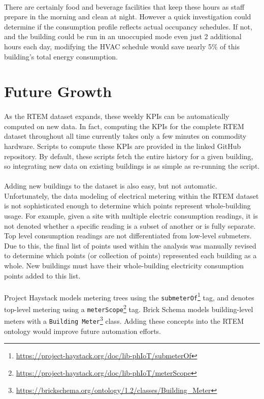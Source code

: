 \documentclass[a4paper]{article}
\begin{document}
\paragraph{}
There are certainly food and beverage facilities that keep these hours as staff prepare in the morning and clean at night. However a quick investigation could determine if the consumption profile reflects actual occupancy schedules. If not, and the building could be run in an unoccupied mode even just 2 additional hours each day, modifying the HVAC schedule would save nearly 5\% of this building's total energy consumption.

\section{Future Growth}

\paragraph{}
As the RTEM dataset expands, these weekly KPIs can be automatically computed on new data. In fact, computing the KPIs for the complete RTEM dataset throughout all time currently takes only a few minutes on commodity hardware. Scripts to compute these KPIs are provided in the linked GitHub repository. By default, these scripts fetch the entire history for a given building, so integrating new data on existing buildings is as simple as re-running the script.

\paragraph{}
Adding new buildings to the dataset is also easy, but not automatic. Unfortunately, the data modeling of electrical metering within the RTEM dataset is not sophisticated enough to determine which points represent whole-building usage. For example, given a site with multiple electric consumption readings, it is not denoted whether a specific reading is a subset of another or is fully separate. Top level consumption readings are not differentiated from low-level submeters. Due to this, the final list of points used within the analysis was manually revised to determine which points (or collection of points) represented each building as a whole. New buildings must have their whole-building electricity consumption points added to this list.

\paragraph{}
Project Haystack models metering trees using the \texttt{submeterOf}\footnote{\url{https://project-haystack.org/doc/lib-phIoT/submeterOf}} tag, and denotes top-level metering using a \texttt{meterScope}\footnote{\url{https://project-haystack.org/doc/lib-phIoT/meterScope}} tag. Brick Schema models building-level meters with a \texttt{Building Meter}\footnote{\url{https://brickschema.org/ontology/1.2/classes/Building\_Meter}} class. Adding these concepts into the RTEM ontology would improve future automation efforts.
\end{document}
